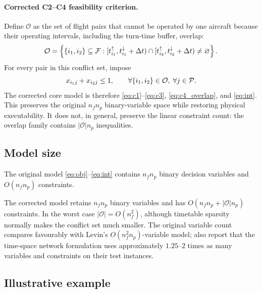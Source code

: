\paragraph{Corrected C2--C4 feasibility criterion.}
Define $\mathcal{O}$ as the set of flight pairs that cannot be operated by one
aircraft because their operating intervals, including the turn-time buffer,
overlap:
\begin{equation}
  \mathcal{O}=\left\{\{i_1,i_2\}\subseteq\mathcal{F}:
  [t^{\uparrow}_{i_1},t^{\downarrow}_{i_1}+\Delta t)\cap
  [t^{\uparrow}_{i_2},t^{\downarrow}_{i_2}+\Delta t)\neq\varnothing\right\}.
  \label{eq:overlap_set}
\end{equation}
For every pair in this conflict set, impose
\begin{equation}\label{eq:c4_overlap}
  x_{i_1 j} + x_{i_2 j} \le 1,
  \qquad \forall \{i_1,i_2\}\in\mathcal{O},\; \forall j\in\mathcal{P}.
\end{equation}
The corrected core model is therefore
\eqref{eq:c1}--\eqref{eq:c3}, \eqref{eq:c4_overlap}, and \eqref{eq:int}.
This preserves the original $n_fn_p$ binary-variable space while restoring
physical executability. It does not, in general, preserve the linear
constraint count: the overlap family contains $|\mathcal{O}|n_p$ inequalities.

\subsection{Model size}

\begin{proposition}
  The original model \eqref{eq:obj}--\eqref{eq:int} contains $n_f n_p$ binary
  decision variables and $O(n_fn_p)$ constraints.
\end{proposition}

The corrected model retains $n_fn_p$ binary variables and has
$O(n_fn_p+|\mathcal{O}|n_p)$ constraints. In the worst case
$|\mathcal{O}|=O(n_f^2)$, although timetable sparsity normally makes the
conflict set much smaller. The original variable count compares favourably
with Levin's $O(n_f^2n_p)$-variable model; \citet{khaled2018compact} also
report that the time-space network formulation uses approximately
$1.25$--$2$ times as many variables and constraints on their test instances.

\subsection{Illustrative example}

